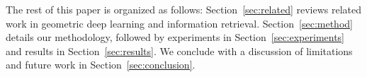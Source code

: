 The rest of this paper is organized as follows: Section~\ref{sec:related} reviews related work in geometric deep learning and information retrieval. Section~\ref{sec:method} details our methodology, followed by experiments in Section~\ref{sec:experiments} and results in Section~\ref{sec:results}. We conclude with a discussion of limitations and future work in Section~\ref{sec:conclusion}.
